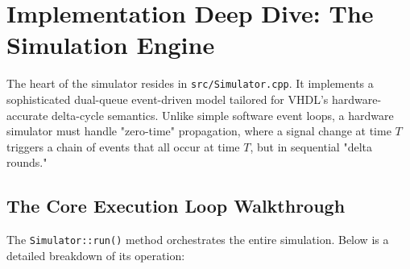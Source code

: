 \documentclass[9pt,a4paper]{article}
\begin{document}
\section{Implementation Deep Dive: The Simulation Engine}
\label{sec:impl}

The heart of the simulator resides in \texttt{src/Simulator.cpp}. It implements a sophisticated dual-queue event-driven model tailored for VHDL's hardware-accurate delta-cycle semantics. Unlike simple software event loops, a hardware simulator must handle "zero-time" propagation, where a signal change at time $T$ triggers a chain of events that all occur at time $T$, but in sequential "delta rounds."

\subsection{The Core Execution Loop Walkthrough}
The \texttt{Simulator::run()} method orchestrates the entire simulation. Below is a detailed breakdown of its operation:
\end{document}
